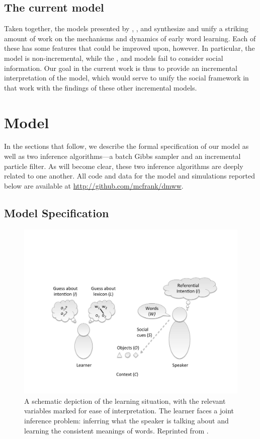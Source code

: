 \documentclass[man,noapacite,12pt]{apa2}
\begin{document}
\subsection{The current model}

Taken together, the models presented by , , and  synthesize and unify a striking amount of work on the mechanisms and dynamics of early word learning. Each of these has some features that could be improved upon, however. In particular, the  model is non-incremental, while the , and  models fail to consider social information. Our goal in the current work is thus to provide an incremental interpretation of the  model, which would serve to unify the social framework in that work with the findings of these other incremental models.

\section{Model}


In the sections that follow, we describe the formal specification of our model as well as two inference algorithms---a batch Gibbs sampler and an incremental particle filter. As will become clear, these two inference algorithms are deeply related to one another. All code and data for the model and simulations reported below are available at \url{http://github.com/mcfrank/dmww}. 

\subsection{Model Specification}

\begin{figure}[tr]
\begin{center}
\includegraphics[width=4.5in]{figures/framework_mod.pdf}
\caption{\label{fig:setup} A schematic depiction of the learning situation, with the relevant variables marked for ease of interpretation. The learner faces a joint inference problem: inferring what the speaker is talking about and learning the consistent meanings of words. Reprinted from \protect{}.}
\end{center}
\end{figure}
\end{document}
